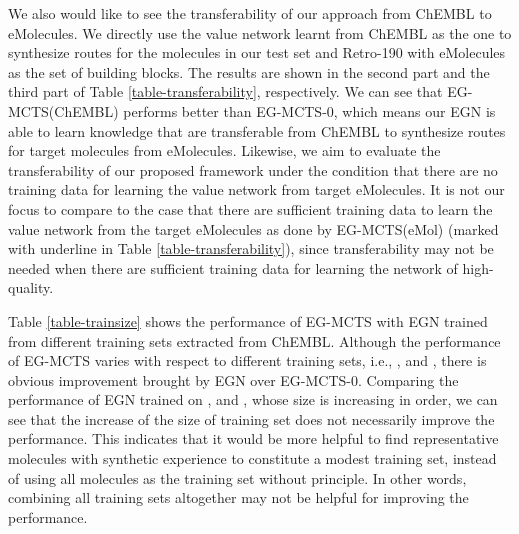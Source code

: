 \documentclass[sn-mathphys,Numbered]{sn-jnl}
\begin{document}
We also would like to see the transferability of our approach from ChEMBL to eMolecules. We directly use the value network learnt from ChEMBL as the one to synthesize routes for the molecules in our test set and Retro-190 with eMolecules as the set of building blocks. The results are shown in the second part and the third part of Table \ref{table-transferability}, respectively.
We can see that EG-MCTS(ChEMBL) performs better than EG-MCTS-0, which means our EGN is able to learn knowledge that are transferable from ChEMBL to synthesize routes for target molecules from eMolecules. 
Likewise, we aim to evaluate the transferability of our proposed framework under the condition that there are no training data for learning the value network from target eMolecules. It is not our focus to compare to the case that there are sufficient training data to learn the value network from the target eMolecules as done by EG-MCTS(eMol) (marked with underline in Table \ref{table-transferability}), since transferability may not be needed when there are sufficient training data for learning the network of high-quality. 


Table \ref{table-trainsize} shows the performance of EG-MCTS with EGN trained from different training sets extracted from ChEMBL.
Although the performance of EG-MCTS varies with respect to different training sets, i.e., ,  and , there is obvious improvement brought by EGN over EG-MCTS-0.
Comparing the performance of EGN trained on ,  and , whose size is increasing in order, we can see that the increase of the size of training set does not necessarily improve the performance.
This indicates that it would be more helpful to find representative molecules with synthetic experience to constitute a modest training set, instead of using all molecules as the training set without principle. In other words, combining all training sets altogether may not be helpful for improving the performance.
\end{document}
